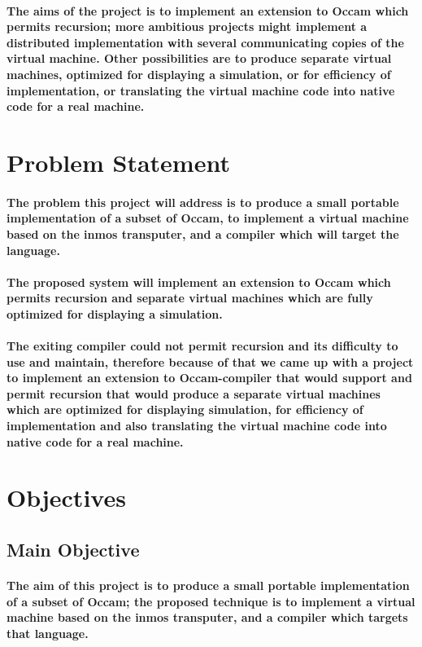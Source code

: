 \documentclass[dvips,12pt]{article}
\begin{document}
	
\paragraph{	The aims of the project is to implement an extension to Occam which permits recursion; more ambitious projects might implement a distributed implementation with several communicating copies of the virtual machine. Other possibilities are to produce separate virtual machines, optimized for displaying a simulation, or for efficiency of implementation, or translating the virtual machine code into native code for a real machine.}

	
	\section{Problem Statement}
	\paragraph{The problem this project will address is to produce a small portable implementation of a subset of Occam, to implement a virtual machine based on the inmos transputer, and a compiler which will target the language.}
	\paragraph{The proposed system will implement an extension to Occam which permits recursion and separate virtual machines which are fully optimized for displaying a simulation.}
	\paragraph{The exiting compiler could not permit recursion and its difficulty to use and maintain, therefore because of that we came up with a project to implement an extension to Occam-compiler that would support and permit recursion that would produce a separate virtual machines which are optimized for displaying simulation, for efficiency of implementation and also translating the virtual machine code into native code for a real machine.}
	
	\section{Objectives}
	\subsection{Main Objective}
	\paragraph{The aim of this project is to produce a small portable implementation of a subset of Occam; the proposed technique is to implement a virtual machine based on the inmos transputer, and a compiler which targets that language.}
\end{document}
